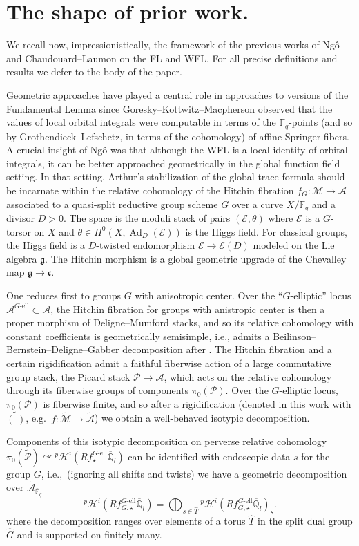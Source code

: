 \documentclass[openany]{amsbook}
\theoremstyle{definition}
\theoremstyle{remark}
\numberwithin{equation}{section}
\newcommand{\Q}{\mathbb{Q}}
\newcommand{\F}{\mathbb{F}}
\newcommand{\cA}{\mathcal{A}}
\newcommand{\cM}{\mathcal{M}}
\newcommand{\cE}{\mathcal{E}}
\newcommand{\cP}{\mathcal{P}}
\newcommand{\ol}[1]{\overline{#1}}
\renewcommand{\-}{\operatorname{-}}
\newcommand{\on}[1]{\operatorname{#1}}
\newcommand{\pHi}{{}^p \mathcal{H}^i}
\newcommand{\wtilde}[1]{\widetilde{#1}}
\newcommand{\ctM}{\widetilde{\cM}}
\newcommand{\ctA}{\widetilde{\cA}}
\newcommand{\ctP}{\widetilde{\cP}}
\newcommand{\fc}{\mathfrak{c}}
\renewcommand{\fg}{\mathfrak{g}}
\newcommand{\Ad}{\on{Ad}}
\newcommand{\Gell}{G\text{-ell}}
\begin{document}
\section{The shape of prior work.}
We recall now, impressionistically, the framework of the previous works of Ng\^{o} and Chaudouard--Laumon on the FL and WFL. For all precise definitions and results we defer to the body of the paper. 

Geometric approaches have played a central role in approaches to versions of the Fundamental Lemma since Goresky--Kottwitz--Macpherson \cite{GKM} observed that the values of local orbital integrals were computable in terms of the $\F_q$-points (and so by Grothendieck--Lefschetz, in terms of the cohomology) of affine Springer fibers. A crucial insight of Ng\^{o} was that although the WFL is a local identity of orbital integrals, it can be better approached geometrically in the global function field setting. In that setting, Arthur's stabilization of the global trace formula should be incarnate within the relative cohomology of the Hitchin fibration $f_G : \cM \to \cA$ associated to a quasi-split reductive group scheme $G$ over a curve $X/\F_q$ and a divisor $D > 0$. The space is the moduli stack of pairs $(\cE, \theta)$ where $\cE$ is a $G$-torsor on $X$ and $\theta \in H^0(X, \Ad_D(\cE))$ is the Higgs field. For classical groups, the Higgs field is a $D$-twisted endomorphism $\cE \to \cE(D)$ modeled on the Lie algebra $\fg$. The Hitchin morphism is a global geometric upgrade of the Chevalley map $\fg \to \fc$.

One reduces first to groups $G$ with anisotropic center. Over the ``$G$-elliptic'' locus $\cA^{\Gell} \subset \cA$, the Hitchin fibration for groups with anistropic center is then a proper morphism of Deligne--Mumford stacks, and so its relative cohomology with constant coefficients is geometrically semisimple, i.e., admits a Beilinson--Bernstein--Deligne--Gabber decomposition after \cite{bbdg}. The Hitchin fibration and a certain rigidification admit a faithful fiberwise action of a large commutative group stack, the Picard stack $\cP \to \cA$, which acts on the relative cohomology through its fiberwise groups of components $\pi_0(\cP)$. Over the $G$-elliptic locus, $\pi_0(\cP)$ is fiberwise finite, and so after a rigidification (denoted in this work with $\wtilde{(\;)}$, e.g.\ $f : \ctM \to \ctA$) we obtain a well-behaved isotypic decomposition.

Components of this isotypic decomposition on perverse relative cohomology $\pi_0(\ctP) \curvearrowright \pHi(R f_\star^{\Gell} \ol{\Q}_l)$ can be identified with endoscopic data $s$ for the group $G$, i.e.,\ (ignoring all shifts and twists) we have a geometric decomposition over $\ctA_{\ol{\F}_q}$
$$
    \pHi(R f_{G,\star}^{\Gell} \ol{\Q}_l) = \bigoplus_{s \in \widehat{T}} \pHi(R f_{G,\star}^{\Gell} \ol{\Q}_l)_s.
$$ 
where the decomposition ranges over elements of a torus $\widehat{T}$ in the split dual group $\widehat{G}$ and is supported on finitely many. 
\end{document}
